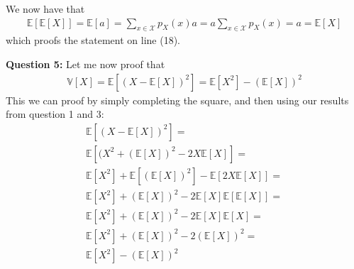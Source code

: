 We now have that
\begin{align}
\mathbb{E}[\mathbb{E}[X]] = \mathbb{E}[a] = \sum_{x\in \mathcal{X}} p_X(x) a = a \sum_{x\in \mathcal{X}} p_X(x) = a = \mathbb{E}[X]
\end{align}
which proofs the statement on line (18).

\textbf{Question 5:} Let me now proof that 
\begin{align}
\mathbb{V}[X] = \mathbb{E}[(X - \mathbb{E}[X])^2] = \mathbb{E}[X^2] - (\mathbb{E}[X])^2
\end{align}
This we can proof by simply completing the square, and then using our results from question 1 and 3:
\begin{align}
\mathbb{E}[(X - \mathbb{E}[X])^2] = \\
\mathbb{E}[(X^2 + (\mathbb{E}[X])^2 - 2X\mathbb{E}[X]] = \\ 
\mathbb{E}[X^2] + \mathbb{E}[(\mathbb{E}[X])^2] - \mathbb{E}[2X\mathbb{E}[X]] = \\ 
\mathbb{E}[X^2] + (\mathbb{E}[X])^2 - 2 \mathbb{E}[X]\mathbb{E}[\mathbb{E}[X]] = \\ 
\mathbb{E}[X^2] + (\mathbb{E}[X])^2 - 2 \mathbb{E}[X]\mathbb{E}[X] = \\ 
\mathbb{E}[X^2] + (\mathbb{E}[X])^2 - 2 (\mathbb{E}[X])^2 = \\ 
\mathbb{E}[X^2] - (\mathbb{E}[X])^2
\end{align}